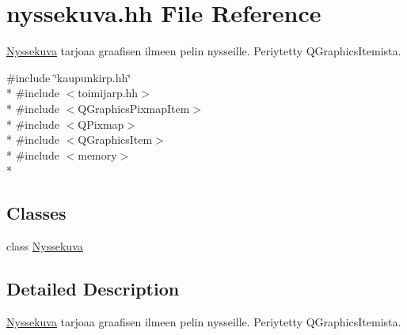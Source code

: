 \hypertarget{nyssekuva_8hh}{\section{nyssekuva.\-hh File Reference}
\label{nyssekuva_8hh}
}


\hyperlink{class_nyssekuva}{Nyssekuva} tarjoaa graafisen ilmeen pelin nysseille. Periytetty Q\-Graphics\-Itemista.  


{\ttfamily \#include \char`\"{}kaupunkirp.\-hh\char`\"{}}\\*
{\ttfamily \#include $<$toimijarp.\-hh$>$}\\*
{\ttfamily \#include $<$Q\-Graphics\-Pixmap\-Item$>$}\\*
{\ttfamily \#include $<$Q\-Pixmap$>$}\\*
{\ttfamily \#include $<$Q\-Graphics\-Item$>$}\\*
{\ttfamily \#include $<$memory$>$}\\*
\subsection*{Classes}
\begin{DoxyCompactItemize}
\item 
class \hyperlink{class_nyssekuva}{Nyssekuva}
\end{DoxyCompactItemize}


\subsection{Detailed Description}
\hyperlink{class_nyssekuva}{Nyssekuva} tarjoaa graafisen ilmeen pelin nysseille. Periytetty Q\-Graphics\-Itemista. 
